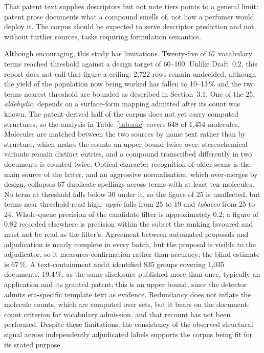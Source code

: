 \documentclass[
  computerscience
]{genesisl1-paper}
\begin{document}
That patent text supplies descriptors but not note tiers points to a general limit:
patent prose documents what a compound smells of, not how a perfumer would deploy it.
The corpus should be expected to serve descriptor prediction and not, without further
sources, tasks requiring formulation semantics.

\begin{GenesisLimitations}
Although encouraging, this study has limitations. Twenty-five of 67 vocabulary terms
reached threshold against a design target of 60--100. Unlike Draft~0.2, this report does
not call that figure a ceiling: 2{,}722 rows remain undecided, although the yield of the
population now being worked has fallen to 10--13\,\% and the two terms nearest threshold
are bounded as described in Section~3.1. One of the 25, \emph{aldehydic}, depends on a
surface-form mapping admitted after its count was known. The patent-derived half of the
corpus does not yet carry computed structures, so the analysis in Table~\ref{tab:auc}
covers 648 of 1{,}454 molecules. Molecules are matched between the two sources by name
text rather than by structure, which makes the counts an upper bound twice over:
stereochemical variants remain distinct entries, and a compound transcribed differently
in two documents is counted twice. Optical character recognition of older scans is the
main source of the latter, and an aggressive normalisation, which over-merges by design,
collapses 67 duplicate spellings across terms with at least ten molecules. No term at
threshold falls below 30 under it, so the figure of 25 is unaffected, but terms near
threshold read high: \emph{apple} falls from 25 to 19 and \emph{tobacco} from 25 to 24.
Whole-queue precision of the candidate filter is approximately 0.2; a figure of 0.82
recorded elsewhere is precision within the subset the ranking favoured and must not be
read as the filter's. Agreement between automated proposals and adjudication is nearly
complete in every batch, but the proposal is visible to the adjudicator, so it measures
confirmation rather than accuracy; the blind estimate is 67\,\%. A text-containment audit identified 835 groups covering
1{,}035 documents,
19.4\,\%, as the same disclosure published more than once, typically an application and
its granted patent; this is an upper bound, since the detector admits era-specific
template text as evidence. Redundancy does not inflate the molecule counts, which are
computed over sets, but it bears on the document-count criterion for vocabulary
admission, and that recount has not been performed. Despite these limitations, the
consistency of the observed structural signal across independently adjudicated labels
supports the corpus being fit for its stated purpose.
\end{GenesisLimitations}
\end{document}
